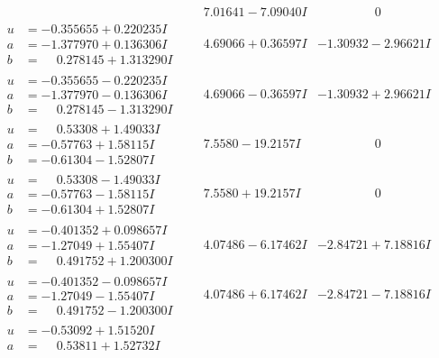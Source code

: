 \documentclass[1p]{elsarticle_modified}
\theoremstyle{definition}
\begin{document}
$$\begin{array}{c|c|c}
 & \phantom{-}7.01641 - 7.09040 I & \phantom{-0.000000 } 0 \\ \hline\begin{aligned}
u &= -0.355655 + 0.220235 I \\
a &= -1.377970 + 0.136306 I \\
b &= \phantom{-}0.278145 + 1.313290 I\end{aligned}
 & \phantom{-}4.69066 + 0.36597 I & -1.30932 - 2.96621 I \\ \hline\begin{aligned}
u &= -0.355655 - 0.220235 I \\
a &= -1.377970 - 0.136306 I \\
b &= \phantom{-}0.278145 - 1.313290 I\end{aligned}
 & \phantom{-}4.69066 - 0.36597 I & -1.30932 + 2.96621 I \\ \hline\begin{aligned}
u &= \phantom{-}0.53308 + 1.49033 I \\
a &= -0.57763 + 1.58115 I \\
b &= -0.61304 - 1.52807 I\end{aligned}
 & \phantom{-}7.5580 - 19.2157 I & \phantom{-0.000000 } 0 \\ \hline\begin{aligned}
u &= \phantom{-}0.53308 - 1.49033 I \\
a &= -0.57763 - 1.58115 I \\
b &= -0.61304 + 1.52807 I\end{aligned}
 & \phantom{-}7.5580 + 19.2157 I & \phantom{-0.000000 } 0 \\ \hline\begin{aligned}
u &= -0.401352 + 0.098657 I \\
a &= -1.27049 + 1.55407 I \\
b &= \phantom{-}0.491752 + 1.200300 I\end{aligned}
 & \phantom{-}4.07486 - 6.17462 I & -2.84721 + 7.18816 I \\ \hline\begin{aligned}
u &= -0.401352 - 0.098657 I \\
a &= -1.27049 - 1.55407 I \\
b &= \phantom{-}0.491752 - 1.200300 I\end{aligned}
 & \phantom{-}4.07486 + 6.17462 I & -2.84721 - 7.18816 I \\ \hline\begin{aligned}
u &= -0.53092 + 1.51520 I \\
a &= \phantom{-}0.53811 + 1.52732 I \\

\end{aligned}
\end{array}$$
\end{document}
